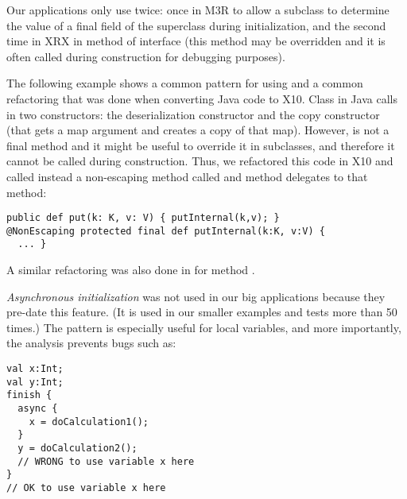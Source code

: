 Our applications only use  twice:
	once in M3R to allow a subclass to determine the value of a final field of the superclass during initialization,
	and the second time in XRX in method  of interface 
	(this method may be overridden  and it is often called during construction for debugging purposes).

The following example shows a common pattern for using  
	and a common refactoring that was done when converting Java code to X10.
Class  in Java calls  in two constructors:
	the deserialization constructor and the copy constructor (that gets a map argument and creates a copy of that map).
However,  is not a final method and it might be useful to override it in subclasses,
	and therefore it cannot be called during construction.
Thus, we refactored this code in X10 and called instead a non-escaping method called 
	and method  delegates to that method:
\begin{lstlisting}
public def put(k: K, v: V) { putInternal(k,v); }
@NonEscaping protected final def putInternal(k:K, v:V) {
  ... }
\end{lstlisting}
A similar refactoring was also done in  for method .

\emph{Asynchronous initialization} was not used in our big applications because they pre-date this feature.
(It is used in our smaller examples and tests more than 50 times.)
The pattern is especially useful for local variables,
	and more importantly, the analysis prevents bugs such as:
\begin{lstlisting}
val x:Int;
val y:Int;
finish {
  async {
    x = doCalculation1();
  }
  y = doCalculation2();
  // WRONG to use variable x here
}
// OK to use variable x here
\end{lstlisting}



